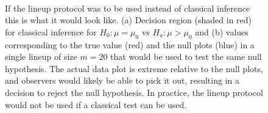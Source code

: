 \documentclass[12]{article}
\begin{document}
\begin{figure}[htbp]
\centering
\mbox{\quad
{}}
\caption{If the lineup protocol was to be used instead of classical inference this is what it would look like. (a) Decision region (shaded in red) for classical inference for $H_0: \mu=\mu_0$ vs $H_a:\mu>\mu_0$  and (b) values corresponding to the true value (red) and the null plots (blue) in a single lineup of size $m=20$ that would be used to test the same null hypothesis.  The actual  data plot is extreme relative to the null plots, and observers would likely be able to pick it out, resulting in a decision to reject the null hypothesis. In practice, the lineup protocol would not be used if a classical test can be used.} 
\label{compare}
\end{figure}


\end{document}
